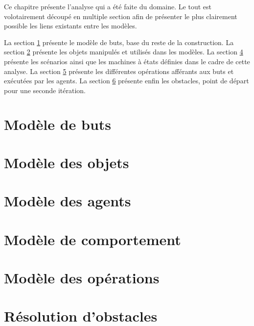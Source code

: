 Ce chapitre présente l'analyse qui a été faite du domaine. Le tout est 
volotairement découpé en multiple section afin de présenter le plus 
clairement possible les liens existants entre les modèles. 

La section \ref{section:buts} présente le modèle de buts, base du reste de 
la construction.
La section \ref{section:objets} présente les objets manipulés et utilisés 
dans les modèles. La section \ref{section:comportement} présente
les scénarios ainsi que les machines à états définies dans le cadre de
cette analyse. 
La section \ref{section:operations} présente les différentes opérations 
afférants aux buts et exécutées par les agents.
La section \ref{section:obstacles} présente enfin les obstacles, point
de départ pour une seconde itération.
	
\section{Modèle de buts}\label{section:buts}
	
	
\section{Modèle des objets}\label{section:objets}
	

\section{Modèle des agents}\label{section:agents}
	
	
\section{Modèle de comportement}\label{section:comportement}
	

\section{Modèle des opérations}\label{section:operations}
	

\section{Résolution d'obstacles}\label{section:obstacles}
	

